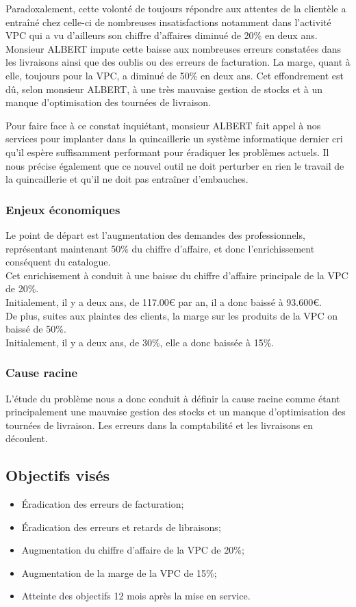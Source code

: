 \documentclass{article}
\begin{document}
Paradoxalement, cette volonté de toujours répondre aux attentes de la clientèle
a entraîné chez celle-ci de nombreuses insatisfactions notamment dans l'activité
VPC qui a vu d'ailleurs son chiffre d'affaires diminué de 20\% en deux ans.
Monsieur ALBERT impute cette baisse aux nombreuses erreurs constatées dans les
livraisons ainsi que des oublis ou des erreurs de facturation. La marge, quant à
elle, toujours pour la VPC, a diminué de 50\% en deux ans. Cet effondrement est
dû, selon monsieur ALBERT, à une très mauvaise gestion de stocks et à un manque
d'optimisation des tournées de livraison.

Pour faire face à ce constat inquiétant, monsieur ALBERT fait appel à nos
services pour implanter dans la quincaillerie un système informatique dernier
cri qu'il espère suffisamment performant pour éradiquer les problèmes actuels.
Il nous précise également que ce nouvel outil ne doit perturber en rien le
travail de la quincaillerie et qu'il ne doit pas entraîner d'embauches.

\subsubsection{Enjeux économiques}
Le point de départ est l'augmentation des demandes des professionnels,
représentant maintenant 50\% du chiffre d'affaire, et donc l'enrichissement
conséquent du catalogue.
\medskip\\
Cet enrichisement à conduit à une baisse du chiffre d'affaire principale de la
VPC de 20\%.
\\\indent Initialement, il y a deux ans, de 117.00€ par an, il a donc baissé à
93.600€.
\medskip\\
De plus, suites aux plaintes des clients, la marge sur les produits de la VPC
on baissé de 50\%.
\\\indent Initialement, il y a deux ans, de 30\%, elle a donc baissée à 15\%.

\subsubsection{Cause racine}
L'étude du problème nous a donc conduit à définir la cause racine comme étant
principalement une mauvaise gestion des stocks et un manque d'optimisation des
tournées de livraison. Les erreurs dans la comptabilité et les livraisons en
découlent.

\subsection{Objectifs visés}
\begin{itemize}
	\item Éradication des erreurs de facturation;
	\item Éradication des erreurs et retards de libraisons;
	\item Augmentation du chiffre d'affaire de la VPC de 20\%;
	\item Augmentation de la marge de la VPC de 15\%;
	\item Atteinte des objectifs 12 mois après la mise en service.
\end{itemize}
\end{document}
